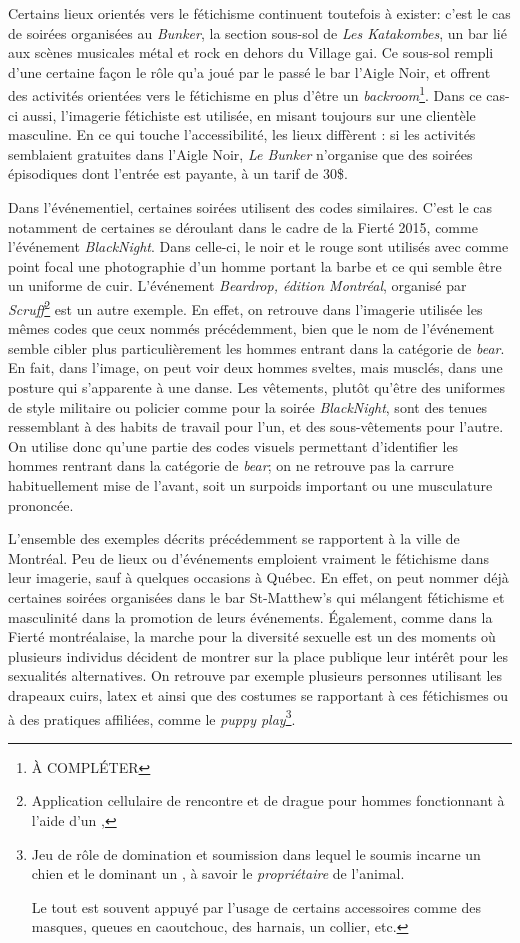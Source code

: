 Certains lieux orientés vers le fétichisme continuent toutefois à exister: c'est le cas de soirées organisées au \emph{Bunker}, la section sous-sol de \emph{Les Katakombes}, un bar lié aux scènes musicales métal et rock en dehors du Village gai.
Ce sous-sol rempli d'une certaine façon le rôle qu'a joué par le passé le bar l'Aigle Noir, et offrent des activités orientées vers le fétichisme en plus d'être un \emph{backroom}\footnote{À COMPLÉTER}.
Dans ce cas-ci aussi, l'imagerie fétichiste est utilisée, en misant toujours sur une clientèle masculine.
En ce qui touche l'accessibilité, les lieux diffèrent : si les activités semblaient gratuites dans l'Aigle Noir, \emph{Le Bunker} n'organise que des soirées épisodiques dont l'entrée est payante, à un tarif de 30\$.

Dans l'événementiel, certaines soirées utilisent des codes similaires.
C'est le cas notamment de certaines se déroulant dans le cadre de la Fierté 2015, comme l'événement  \emph{BlackNight}.
Dans celle-ci, le noir et le rouge sont utilisés avec comme point focal une photographie d'un homme portant la barbe et ce qui semble être un uniforme de cuir.
L'événement \emph{Beardrop, édition Montréal}, organisé par \emph{Scruff}\footnote{Application cellulaire de rencontre et de drague pour hommes fonctionnant à l'aide d'un \gps{} ,} est un autre exemple.
En effet, on retrouve dans l'imagerie utilisée les mêmes codes que ceux nommés précédemment, bien que le nom de l'événement semble cibler plus particulièrement les hommes entrant dans la catégorie de \emph{bear}.
En fait, dans l'image, on peut voir deux hommes sveltes, mais musclés, dans une posture qui s'apparente à une danse.
Les vêtements, plutôt qu'être des uniformes de style militaire ou policier comme pour la soirée \emph{BlackNight}, sont des tenues ressemblant à des habits de travail pour l'un, et des sous-vêtements pour l'autre.
On utilise donc qu'une partie des codes visuels permettant d'identifier les hommes rentrant dans la catégorie de \emph{bear}; on ne retrouve pas la carrure habituellement mise de l'avant, soit un surpoids important ou une musculature prononcée.

L'ensemble des exemples décrits précédemment se rapportent à la ville de Montréal.
Peu de lieux ou d'événements emploient vraiment le fétichisme dans leur imagerie, sauf à quelques occasions à Québec.
En effet, on peut nommer déjà certaines soirées organisées dans le bar St-Matthew's qui mélangent fétichisme et masculinité dans la promotion de leurs événements.
Également, comme dans la Fierté montréalaise, la marche pour la diversité sexuelle est un des moments où plusieurs individus décident de montrer sur la place publique leur intérêt pour les sexualités alternatives.
On retrouve par exemple plusieurs personnes utilisant les drapeaux cuirs, latex et \bdsm{} ainsi que des costumes se rapportant à ces fétichismes ou à des pratiques affiliées, comme le \emph{puppy play}\footnote{Jeu de rôle de domination et soumission dans lequel le soumis incarne un chien  et le dominant un , à savoir le \emph{propriétaire} de l'animal.

Le tout est souvent appuyé par l'usage de certains accessoires comme des masques, queues en caoutchouc, des harnais, un collier, etc.}.

